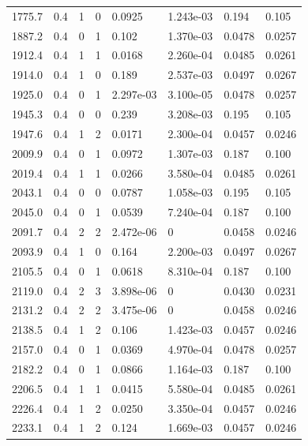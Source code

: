\documentclass[preview]{standalone}
\begin{document}
{{{\begin{tabular}{L{1.2cm}C{1.2cm} C{0.3cm}C{0.5cm} C{1.4cm}C{1.4cm} C{1.4cm}C{1.4cm}}
  1775.7  &   0.4  & 1     &  0 &  0.0925  & 1.243e-03  & 0.194 &  0.105   \\ 
  1887.2  &   0.4  & 0     &  1 &  0.102  & 1.370e-03  & 0.0478 &  0.0257   \\ 
  1912.4  &   0.4  & 1     &  1 &  0.0168  & 2.260e-04  & 0.0485 &  0.0261   \\ 
  1914.0  &   0.4  & 1     &  0 &  0.189  & 2.537e-03  & 0.0497 &  0.0267   \\ 
  1925.0  &   0.4  & 0     &  1 &  2.297e-03  & 3.100e-05  & 0.0478 &  0.0257   \\ 
  1945.3  &   0.4  & 0     &  0 &  0.239  & 3.208e-03  & 0.195 &  0.105   \\ 
  1947.6  &   0.4  & 1     &  2 &  0.0171  & 2.300e-04  & 0.0457 &  0.0246   \\ 
  2009.9  &   0.4  & 0     &  1 &  0.0972  & 1.307e-03  & 0.187 &  0.100   \\ 
  2019.4  &   0.4  & 1     &  1 &  0.0266  & 3.580e-04  & 0.0485 &  0.0261   \\ 
  2043.1  &   0.4  & 0     &  0 &  0.0787  & 1.058e-03  & 0.195 &  0.105   \\ 
  2045.0  &   0.4  & 0     &  1 &  0.0539  & 7.240e-04  & 0.187 &  0.100   \\ 
  2091.7  &   0.4  & 2     &  2 &  2.472e-06  & 0  & 0.0458 &  0.0246   \\ 
  2093.9  &   0.4  & 1     &  0 &  0.164  & 2.200e-03  & 0.0497 &  0.0267   \\ 
  2105.5  &   0.4  & 0     &  1 &  0.0618  & 8.310e-04  & 0.187 &  0.100   \\ 
  2119.0  &   0.4  & 2     &  3 &  3.898e-06  & 0  & 0.0430 &  0.0231   \\ 
  2131.2  &   0.4  & 2     &  2 &  3.475e-06  & 0  & 0.0458 &  0.0246   \\ 
  2138.5  &   0.4  & 1     &  2 &  0.106  & 1.423e-03  & 0.0457 &  0.0246   \\ 
  2157.0  &   0.4  & 0     &  1 &  0.0369  & 4.970e-04  & 0.0478 &  0.0257   \\ 
  2182.2  &   0.4  & 0     &  1 &  0.0866  & 1.164e-03  & 0.187 &  0.100   \\ 
  2206.5  &   0.4  & 1     &  1 &  0.0415  & 5.580e-04  & 0.0485 &  0.0261   \\ 
  2226.4  &   0.4  & 1     &  2 &  0.0250  & 3.350e-04  & 0.0457 &  0.0246   \\ 
  2233.1  &   0.4  & 1     &  2 &  0.124  & 1.669e-03  & 0.0457 &  0.0246   \\ 

\end{tabular}}}}
\end{document}
